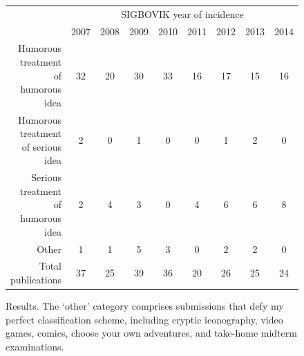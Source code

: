 \documentclass[12pt]{article}
\begin{document}
\begin{figure}[h]
\begin{center}
\begin{tabular}{r|c|c|c|c|c|c|c|c|}
& \multicolumn{8}{c|}{SIGBOVIK year of incidence} \\
& 2007 & 2008 & 2009 & 2010 & 2011 & 2012 & 2013 & 2014 \\
\hline
\hline
Humorous treatment of humorous idea & 32 & 20 & 30 & 33 & 16 & 17 & 15 & 16 \\ \hline
Humorous treatment of serious idea  & 2  & 0  & 1  & 0  & 0  & 1  & 2  & 0 \\ \hline
Serious treatment of humorous idea  & 2  & 4  & 3  & 0  & 4  & 6  & 6  & 8 \\ \hline
Other                               & 1  & 1  & 5  & 3  & 0  & 2  & 2  & 0 \\ \hline
\hline
Total publications                  & 37 & 25 & 39 & 36 & 20 & 26 & 25 & 24 \\

\end{tabular}
\end{center}
\caption{Results. The `other' category comprises submissions that defy my perfect classification scheme, including cryptic iconography, video games, comics, choose your own adventures, and take-home midterm examinations.}
\label{fig:results}
\end{figure}
\end{document}

